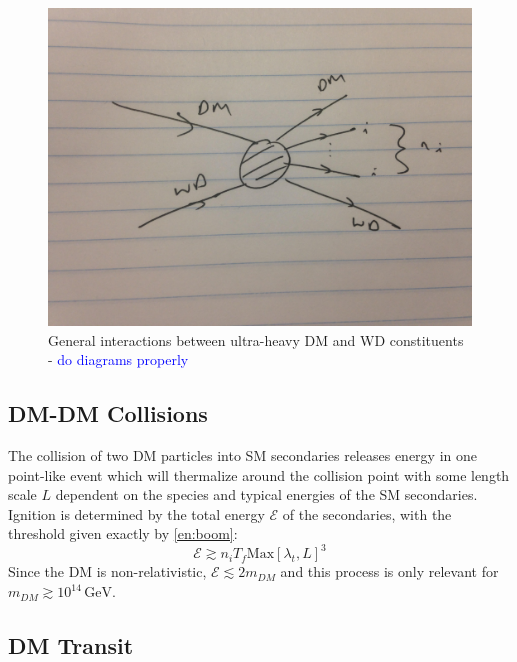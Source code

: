 \documentclass[twocolumn,showpacs,preprintnumbers,amsmath,amssymb,prd]{revtex4}
\newcommand{\GeV}{\text{GeV}}
\begin{document}
\begin{figure}
\label{feynman}
\includegraphics[scale=.05]{feynmandiag}
\caption{General interactions between ultra-heavy DM and WD constituents - \textcolor{blue}{do diagrams properly}}
\end{figure}

\subsection{DM-DM Collisions}

The collision of two DM particles into SM secondaries releases energy in one point-like event which will thermalize around the collision point with some length scale $L$ dependent on the species and typical energies of the SM secondaries.  Ignition is determined by the total energy $\mathcal{E}$ of the secondaries, with the threshold given exactly by \eqref{en:boom}:
\[
    \mathcal{E} \gtrsim n_i T_f \text{Max}\left[\lambda_t, L\right]^3
\]
Since the DM is non-relativistic, $\mathcal{E} \lesssim 2 m_{DM}$ and this process is only relevant for $m_{DM} \gtrsim 10^{14} \, \GeV$.


\subsection{DM Transit}
\end{document}
